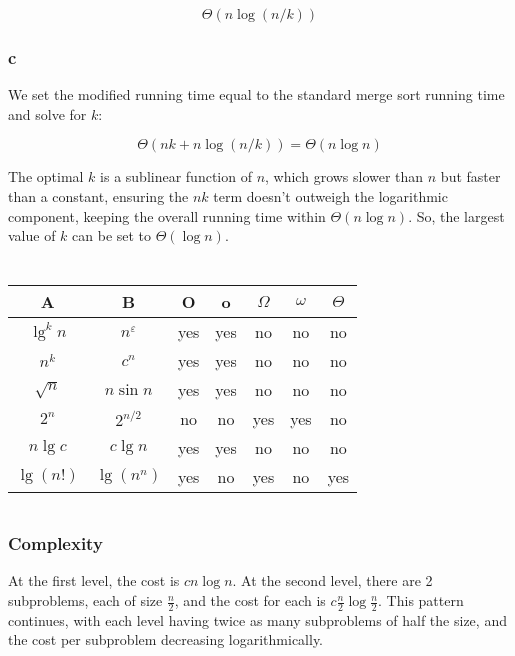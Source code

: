 \documentclass{article}
\begin{document}
\[
\Theta(n \log(n/k))
\]

\subsubsection*{c}

We set the modified running time equal to the standard merge sort running time and solve for \(k\):

\[
\Theta(nk + n \log(n/k)) = \Theta(n \log n)
\]

The optimal \(k\) is a sublinear function of \(n\), which grows slower than \(n\) but faster than a constant, ensuring the \(nk\) term doesn't outweigh the logarithmic component, keeping the overall running time within \( \Theta(n\log n) \). So, the largest value of \( k \) can be set to \(\Theta(\log n)\).

\section{}
\begin{tabular}{c|c|c|c|c|c|c}
\hline
\textbf{A} & \textbf{B} & \textbf{O} & \textbf{o} & \textbf{$\Omega$} & \textbf{$\omega$} & \textbf{$\Theta$} \\
\hline
$\lg^k n$ & $n^\varepsilon$ & yes & yes & no & no & no \\
$n^k$ & $c^n$ & yes & yes & no & no & no \\
$\sqrt{n}$ & $n \sin n$ & yes & yes & no & no & no \\
$2^n$ & $2^{n/2}$ & no & no & yes & yes & no \\
$n \lg c$ & $c \lg n$ & yes & yes & no & no & no \\
$\lg(n!)$ & $\lg(n^n)$ & yes & no & yes & no & yes \\
\hline
\end{tabular}


\section{}

\subsubsection*{Complexity}

At the first level, the cost is \( cn\log n \).
At the second level, there are 2 subproblems, each of size \( \frac{n}{2} \), and the cost for each is \( c\frac{n}{2}\log\frac{n}{2} \).
This pattern continues, with each level having twice as many subproblems of half the size, and the cost per subproblem decreasing logarithmically.
\end{document}
